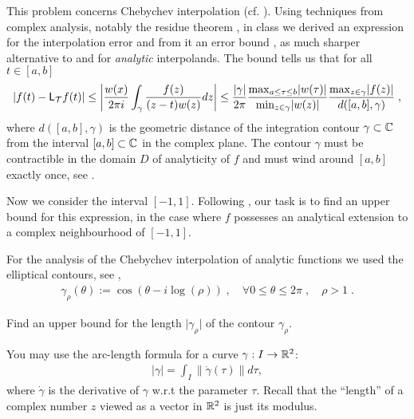 \begin{problem} 
 
This problem concerns Chebychev interpolation
(cf. ). Using techniques from complex
analysis, notably the residue theorem , in class we derived an
expression for the interpolation error  and from it an error
bound , as much sharper alternative to 
and  for \emph{analytic} interpolands. The bound tells us
that for all $t\in [a,b]$
\begin{align*}
  \lvert f(t) - \mathsf{L}_{{\cal T}} f(t) \rvert 
   \leq 
   \left\lvert \frac{w(x)}{2 \pi i} \int_\gamma 
   \frac{f(z)}{(z-t) w(z)} dz \right\rvert 
  \leq \frac{\lvert \gamma \rvert}{2 \pi} 
  \frac{\max_{a \leq \tau \leq b}\lvert w(\tau) \rvert}{\min_{z \in  \gamma}\lvert
  w(z) \rvert} 
  \frac{ \max_{z \in \gamma} \lvert f(z) \rvert }{d([a,b], \gamma)}\;,
\end{align*}
where {$d([a,b],\gamma)$} is the geometric distance of the integration contour
$\gamma\subset\mathbb{C}$ from the interval $[a,b]\subset\mathbb{C}$ in the complex plane. The
contour $\gamma$ must be contractible in the domain $D$ of analyticity of $f$ and
must wind around $[a,b]$ exactly once, see . 

Now we consider the interval $[-1,1]$. Following , our
task is to find an upper bound for this expression, in the case where $f$
possesses an analytical extension to a complex neighbourhood of $[-1,1]$.

For the analysis of the Chebychev interpolation of analytic functions we used the
elliptical contours, see ,
\begin{align}
 \gamma_\rho(\theta) := \cos(\theta - i \log(\rho) )\;,\quad
  \forall 0 \leq \theta \leq 2 \pi\;,\quad \rho > 1\;.
\end{align}

\begin{subproblem}[2]
 Find an upper bound for the length $\lvert \gamma_\rho \rvert$ of the contour $\gamma_\rho$.
 
 \begin{hint}
  You may use the arc-length formula for a curve $\gamma: I \rightarrow \mathbb{R}^2$:
  \begin{align}
   \lvert \gamma \rvert = \int_I \lVert \dot\gamma(\tau) \rVert d\tau,
  \end{align}
  where $\dot\gamma$ is the derivative of $\gamma$ w.r.t the parameter
  $\tau$. Recall that the ``length'' of a complex number $z$ viewed as a vector in 
  $\mathbb{R}^{2}$ is just its modulus. 
 \end{hint}


\end{subproblem}
\end{problem}
